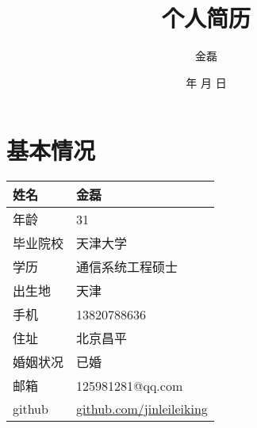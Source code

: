\documentclass[titlepage]{article}
\begin{document}

\pagestyle{fancy}
\lhead{}
\lfoot{}
\cfoot{}
\rfoot{}
\renewcommand{\headrulewidth}{0.4pt}
\renewcommand{\footrulewidth}{0.4pt}

\title{个人简历} 
\author{金磊} 
\renewcommand{\today}{\number\year 年 \number\month 月 \number\day 日}
\date{\today} 
\maketitle

\setlength{\parindent}{2em} 
\addtolength{\parskip}{3pt}

\renewcommand{\contentsname}{目录}
\setcounter{tocdepth}{2}
\tableofcontents 

\newpage
\section{基本情况}

\begin{tabular}{|l|l|}
\hline
姓名 & 金磊 \\
\hline
年龄 & 31 \\
\hline
毕业院校 & 天津大学 \\
\hline
学历 & 通信系统工程硕士 \\
\hline 
出生地 & 天津 \\
\hline 
手机 & 13820788636 \\
\hline 
住址 & 北京昌平 \\
\hline 
婚姻状况 & 已婚 \\
\hline 
邮箱 & 125981281@qq.com \\
\hline 
github & \href{http:/www.github.com/jinleileiking?tab=repositories}{github.com/jinleileiking} \\
\hline
\end{tabular}
\end{document}
